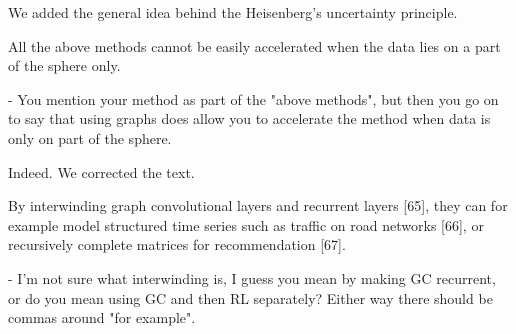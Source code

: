 \documentclass[12pt,a4paper]{article}
\newcommand{\nati}[1]{{\color[rgb]{.1,.6,.1}{NP: #1}}}
\newcommand{\mdeff}[1]{{\color[rgb]{.1,.6,.1}{MD: #1}}}
\newcommand{\1}{\b{1}}              %
\newcommand{\0}{\b{0}}              %
\begin{document}
We added the general idea behind the Heisenberg's uncertainty principle.




\begin{mdframed}[style=comment]
All the above methods cannot be easily accelerated when the data lies on a part of the sphere only.

- You mention your method as part of the "above methods", but then you go on to say that using graphs does allow you to accelerate the method when data is only on part of the sphere.
\end{mdframed}

Indeed.
We corrected the text.

\begin{mdframed}[style=comment]
By interwinding graph convolutional layers and recurrent layers [65], they can for example model structured time series such as traffic on road networks [66], or recursively complete matrices for recommendation [67].

- I'm not sure what interwinding is, I guess you mean by making GC recurrent, or do you mean using GC and then RL separately? Either way there should be commas around "for example".
\end{mdframed}
\end{document}
